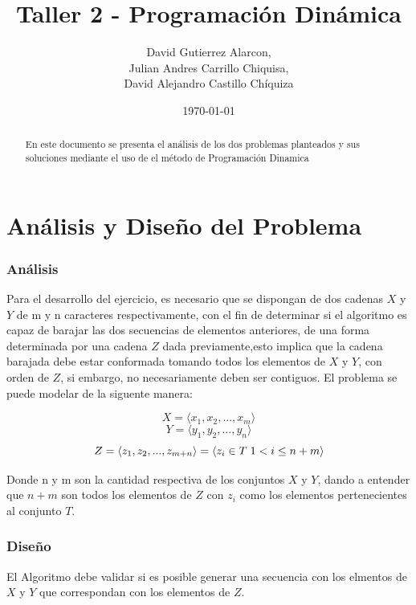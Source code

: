 \documentclass[]{article}
\numberwithin{equation}{section}
\numberwithin{figure}{section}
\theoremstyle{definition}
\begin{document}
\title{Taller 2 - Programación Dinámica}
\author{%
David Gutierrez Alarcon,\\ Julian Andres Carrillo Chiquisa,\\ David Alejandro Castillo Chíquiza}
\date{%
\today}
\maketitle

\begin{abstract}
En este documento se presenta el análisis de los dos problemas planteados y sus soluciones mediante el uso de el método de Programación Dinamica
\end{abstract}

\part*{Análisis y Diseño del Problema}

\section*{Análisis}

\text Para el desarrollo del ejercicio, es necesario que se dispongan de dos cadenas $X$ y $Y$ de m y n caracteres respectivamente, con el fin de determinar si el algoritmo es capaz de barajar las dos  secuencias de elementos anteriores, de una forma determinada por una cadena $Z$ dada previamente,esto implica que la cadena barajada debe estar conformada tomando todos los elementos de $X$ y $Y$, con orden de $Z$, si embargo, no necesariamente deben ser contiguos. El problema se puede modelar de la siguente manera: 

$$X=\langle x_1,x_2,...,x_m \rangle$$
$$Y=\langle y_1,y_2,...,y_n \rangle$$
$$Z=\langle z_1,z_2,...,z_{m+n} \rangle = \langle z_i \in T \hspace{1mm} 1<i \leq n+m \rangle$$

\text Donde n y m son la cantidad respectiva de los conjuntos $X$ y $Y$, dando a entender que $n+m$ son todos los elementos de $Z$ con $z_i$ como los elementos pertenecientes al conjunto $T$.


\section*{Diseño}

\text El Algoritmo debe validar si es posible generar una secuencia con los elmentos de $X$ y $Y$ que correspondan con los elementos de $Z$.
\end{document}
